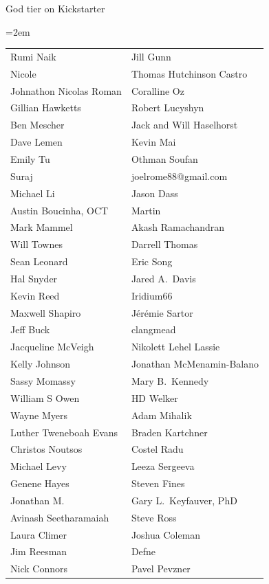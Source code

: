 God tier on Kickstarter
\begin{center}
\tabcolsep=2em
\begin{tabular}{l l}
Rumi Naik & Jill Gunn\\
Nicole & Thomas Hutchinson Castro\\
Johnathon Nicolas Roman & Coralline Oz\\
Gillian Hawketts & Robert Lucyshyn\\
Ben Mescher & Jack and Will Haselhorst\\
Dave Lemen & Kevin Mai\\
Emily Tu & Othman Soufan\\
Suraj & joelrome88@gmail.com\\
Michael Li & Jason Dass\\
Austin Boucinha, OCT & Martin\\
Mark Mammel & Akash Ramachandran\\
Will Townes & Darrell Thomas\\
Sean Leonard & Eric Song\\
Hal Snyder & Jared A.~Davis\\
Kevin Reed & Iridium66\\
Maxwell Shapiro & Jérémie Sartor\\
Jeff Buck & clangmead\\
Jacqueline McVeigh & Nikolett Lehel Lassie\\
Kelly Johnson & Jonathan McMenamin-Balano\\
Sassy Momassy & Mary B.~Kennedy\\
William S Owen & HD Welker\\
Wayne Myers & Adam Mihalik\\
Luther Tweneboah Evans & Braden Kartchner\\
Christos Noutsos & Costel Radu\\
Michael Levy & Leeza Sergeeva\\
Genene Hayes & Steven Fines\\
Jonathan M. & Gary L.~Keyfauver, PhD\\
Avinash Seetharamaiah & Steve Ross\\
Laura Climer & Joshua Coleman\\
Jim Reesman & Defne\\
Nick Connors & Pavel Pevzner\\
\end{tabular}
\end{center}

